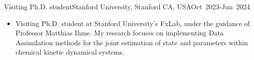 \begin{position}{Visiting Ph.D. student}{Stanford University, Stanford CA, USA}{Oct~2023-Jun~2024}
   \begin{itemize}
      \item[ ] Visiting Ph.D. student at Stanford University's FxLab, under the guidance of
         Professor Matthias Ihme. My research focuses on implementing Data Assimilation
         methods for the joint estimation of state and parameters within chemical kinetic
         dynamical systems.
   \end{itemize}
\end{position}
